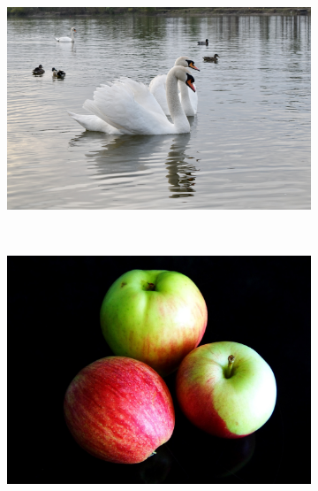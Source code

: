 \documentclass[../../mathematics_cheat_sheet.tex]{subfiles}
\begin{document}
\begin{figure}
  \centering
     \begin{subfigure}{.8\textwidth}
         \centering
         \includegraphics[width=\textwidth]{img/birds.jpeg}
         \caption{}
         \label{fig:birds}
     \end{subfigure}\\
     \begin{subfigure}{0.45\textwidth}
         \centering
         \includegraphics[width=\textwidth]{img/apples.jpeg}
         \caption{}
         \label{fig:apples}
     \end{subfigure}
     \begin{subfigure}{0.5\textwidth}
         \centering

\end{subfigure}
\end{figure}
\end{document}
